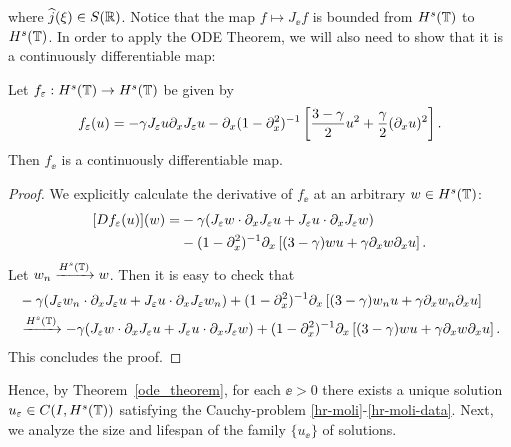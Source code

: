 %
where $\widehat{j}(\xi) \in S(\mathbb{R})$. Notice that the map $f \mapsto J_{\ee} f$ is bounded from $H^s(\mathbb{T})$
to $H^s(\mathbb{T})$.  In order to apply the ODE Theorem, we will also need to
show that it is a continuously differentiable map:
%
%
%
\begin{lemma}
Let $f_\varepsilon:H^s(\mathbb{T}) \to H^s(\mathbb{T})$ be given by 
\begin{equation}
\label{f_ep}
f_{\varepsilon}(u) = -\gamma  J_\varepsilon u \partial_x J_\varepsilon u
- \partial_x (1-\partial_x^2)^{-1} \left
[\frac{3-\gamma}{2}u^2 + \frac{\gamma}{2}(\partial_x u)^2 \right ].
\end{equation}
Then $f_\ee$  is a continuously differentiable map.
\end{lemma}
%
%
\begin{proof} We explicitly calculate the derivative of $f_\ee$ at an
arbitrary $w \in H^s(\mathbb{T})$:
\begin{equation*}
\begin{split}
[Df_{\varepsilon}(u)](w)
=
& -\gamma (J_\varepsilon w \cdot \partial_x J_\varepsilon u +
J_\varepsilon u \cdot \partial_x J_\varepsilon w)
\\
& - (1-\partial_x ^2)^{-1}
\partial_x \left [(3-\gamma)w u + \gamma\partial_x w \partial_x u \right ].
\end{split}
\end{equation*}
Let $w_n \xrightarrow{H^s(\mathbb{T})} w$. Then it is easy to check that
%
\begin{equation}
\begin{split}
& -\gamma (J_\varepsilon w_n \cdot \partial_x J_\varepsilon u 
+ J_\varepsilon u \cdot \partial_x J_\varepsilon w_n)
+ (1-\partial_x ^2)^{-1}
\partial_x \left [(3-\gamma)w_n u + \gamma\partial_x w_n \partial_x u \right ]
\\
& \xrightarrow{H^s(\mathbb{T})} 
-\gamma (J_\varepsilon w \cdot \partial_x J_\varepsilon u 
+ J_\varepsilon u \cdot \partial_x J_\varepsilon w) + (1-\partial_x ^2)^{-1}
\partial_x \left [(3-\gamma)w u + \gamma\partial_x w \partial_x u \right ].
\end{split}
\end{equation}
This concludes the proof. 
\end{proof}
Hence, by Theorem~\ref{ode_theorem}, for each $\ee > 0$ there exists a
unique solution $u_\varepsilon \in C(I, H^s(\mathbb{T}))$ satisfying the Cauchy-problem
\eqref{hr-moli}-\eqref{hr-moli-data}. Next, we analyze the size and
lifespan of the family $\{u_\ee\}$ of solutions.
%
%
%
%
